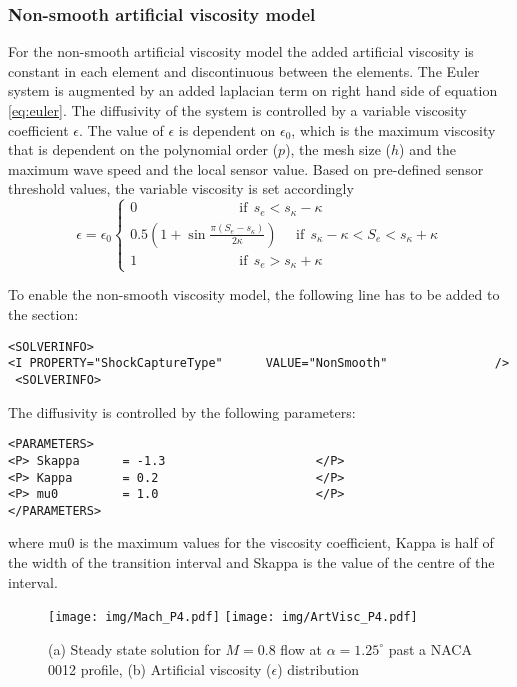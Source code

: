 \subsubsection{Non-smooth artificial viscosity model}
For the non-smooth artificial viscosity model the added artificial viscosity is constant in each element and discontinuous between the elements. The Euler system is augmented by an added laplacian term on right hand side of equation \ref{eq:euler}. The diffusivity of the system is controlled by a variable viscosity coefficient $\epsilon$. The value of $\epsilon$ is dependent on $\epsilon_0$, which is the maximum viscosity that is dependent on the polynomial order ($p$), the mesh size ($h$) and the maximum wave speed and the local sensor value. Based on pre-defined sensor threshold values, the variable viscosity is set accordingly
\begin{equation}
   \epsilon
=\epsilon_0\left \{ \begin{array}{l}
    0\	\	\	\	\	\	\	\	\	\	\	\	\	\	\	\	\	\	\	\	\	\	\	\	\	\	\	\	\	\	\	\	\	 \mbox{if}\		\	 s_e<s_\kappa-\kappa\\
    0.5\left(1+\sin{\frac{\pi\left(S_e-s_\kappa\right)}{2\kappa}}\right)\	\	\	\	\	\	\mbox{if}\		\	 s_\kappa-\kappa<S_e<s_\kappa+\kappa\\
    1\	\	\	\	\	\	\	\	\	\	\	\	\	\	\	\	\	\	\	\	\	\	\	\	\	\	\	\	\	\	\	\	\	 \mbox{if}\		\ s_e > s_\kappa+\kappa
      \end{array}
    \right.
\end{equation}

To enable the non-smooth viscosity model, the following line has to be added to the  section:
\begin{lstlisting}[style=XmlStyle]
 <SOLVERINFO>
<I PROPERTY="ShockCaptureType"      VALUE="NonSmooth"               />
 <SOLVERINFO>
\end{lstlisting}
The diffusivity is controlled by the following parameters:
\begin{lstlisting}[style=XmlStyle]
<PARAMETERS>
<P> Skappa 	 	= -1.3                     </P>
<P> Kappa 	 	= 0.2                      </P>
<P> mu0 	 	= 1.0                      </P>
</PARAMETERS>
\end{lstlisting}
where mu0 is the maximum values for the viscosity coefficient,
Kappa is half of the width of the transition interval and Skappa is
the value of the centre of the interval.
\begin{figure}[!htbp]
\begin{center}
\texttt{[image: img/Mach\_P4.pdf]}
\texttt{[image: img/ArtVisc\_P4.pdf]}
\caption{(a) Steady state solution for $M=0.8$ flow at $\alpha = 1.25^\circ$ past a NACA 0012 profile, (b) Artificial viscosity ($\epsilon$) distribution}
\label{fig:}
\end{center}
\end{figure}

